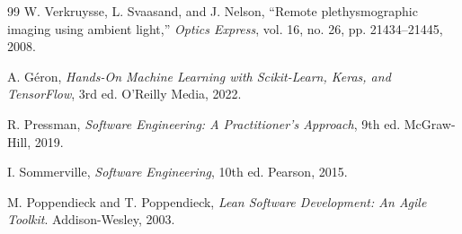 \documentclass[12pt,a4paper]{report}
\begin{document}
\begin{thebibliography}{99}
W. Verkruysse, L. Svaasand, and J. Nelson, ``Remote plethysmographic imaging using ambient light,'' \textit{Optics Express}, vol. 16, no. 26, pp. 21434--21445, 2008.

A. G\'{e}ron, \textit{Hands-On Machine Learning with Scikit-Learn, Keras, and TensorFlow}, 3rd ed. O'Reilly Media, 2022.

R. Pressman, \textit{Software Engineering: A Practitioner's Approach}, 9th ed. McGraw-Hill, 2019.

I. Sommerville, \textit{Software Engineering}, 10th ed. Pearson, 2015.

M. Poppendieck and T. Poppendieck, \textit{Lean Software Development: An Agile Toolkit}. Addison-Wesley, 2003.

\end{thebibliography}
\end{document}
